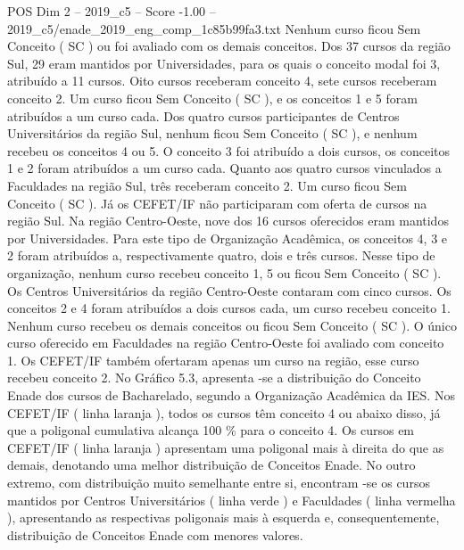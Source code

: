 \begin{textsample}{POS Dim 2 – 2019\_c5 – Score -1.00 – 2019\_c5/enade\_2019\_eng\_comp\_1c85b99fa3.txt}
Nenhum curso ficou Sem Conceito ( SC ) ou foi avaliado com os demais conceitos.
Dos 37 cursos da região Sul, 29 eram mantidos por Universidades, para os quais o conceito modal foi 3, atribuído a 11 cursos.
Oito cursos receberam conceito 4, sete cursos receberam conceito 2.
Um curso ficou Sem Conceito ( SC ), e os conceitos 1 e 5 foram atribuídos a um curso cada.
Dos quatro cursos participantes de Centros Universitários da região Sul, nenhum ficou Sem Conceito ( SC ), e nenhum recebeu os conceitos 4 ou 5.
O conceito 3 foi atribuído a dois cursos, os conceitos 1 e 2 foram atribuídos a um curso cada.
Quanto aos quatro cursos vinculados a Faculdades na região Sul, três receberam conceito 2.
Um curso ficou Sem Conceito ( SC ).
Já os CEFET/IF não participaram com oferta de cursos na região Sul.
Na região Centro-Oeste, nove dos 16 cursos oferecidos eram mantidos por Universidades.
Para este tipo de Organização Acadêmica, os conceitos 4, 3 e 2 foram atribuídos a, respectivamente quatro, dois e três cursos.
Nesse tipo de organização, nenhum curso recebeu conceito 1, 5 ou ficou Sem Conceito ( SC ).
Os Centros Universitários da região Centro-Oeste contaram com cinco cursos.
Os conceitos 2 e 4 foram atribuídos a dois cursos cada, um curso recebeu conceito 1.
Nenhum curso recebeu os demais conceitos ou ficou Sem Conceito ( SC ).
O único curso oferecido em Faculdades na região Centro-Oeste foi avaliado com conceito 1.
Os CEFET/IF também ofertaram apenas um curso na região, esse curso recebeu conceito 2.
No Gráfico 5.3, apresenta -se a distribuição do Conceito Enade dos cursos de Bacharelado, segundo a Organização Acadêmica da IES.
Nos CEFET/IF ( linha laranja ), todos os cursos têm conceito 4 ou abaixo disso, já que a poligonal cumulativa alcança 100 \% para o conceito 4.
Os cursos em CEFET/IF ( linha laranja ) apresentam uma poligonal mais à direita do que as demais, denotando uma melhor distribuição de Conceitos Enade.
No outro extremo, com distribuição muito semelhante entre si, encontram -se os cursos mantidos por Centros Universitários ( linha verde ) e Faculdades ( linha vermelha ), apresentando as respectivas poligonais mais à esquerda e, consequentemente, distribuição de Conceitos Enade com menores valores.

\end{textsample}
